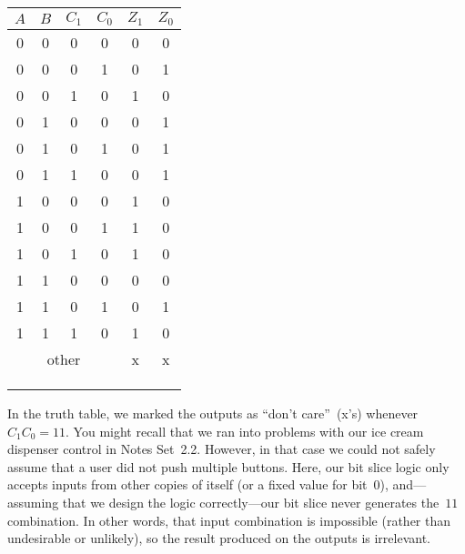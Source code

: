 \begin{minipage}{1.85in}
\begin{tabular}{cccc|cc}
$A$& $B$& $C_1$& $C_0$& $Z_1$& $Z_0$\\ \hline
0& 0& 0& 0& 0& 0\\
0& 0& 0& 1& 0& 1\\
0& 0& 1& 0& 1& 0\\ \hline
0& 1& 0& 0& 0& 1\\
0& 1& 0& 1& 0& 1\\
0& 1& 1& 0& 0& 1\\ \hline
1& 0& 0& 0& 1& 0\\
1& 0& 0& 1& 1& 0\\
1& 0& 1& 0& 1& 0\\ \hline
1& 1& 0& 0& 0& 0\\
1& 1& 0& 1& 0& 1\\
1& 1& 1& 0& 1& 0\\ \hline
\multicolumn{4}{c|}{other}& x& x\\
\\ \\ \\
\end{tabular}
\end{minipage}

In the truth table, we 
marked the outputs as ``don't care''~(x's) whenever $C_1C_0=11$.
You might recall that we ran into problems with our ice cream dispenser
control in Notes Set~2.2.  However, in that case we could not safely
assume that a user did not push multiple buttons.  Here, our bit
slice logic only accepts inputs from other copies of itself (or a fixed
value for bit~0), and---assuming that we design the logic
correctly---our bit slice never generates the~$11$ combination.
In other words, that input combination is impossible (rather than
undesirable or unlikely), so the result produced on the outputs is 
irrelevant.


